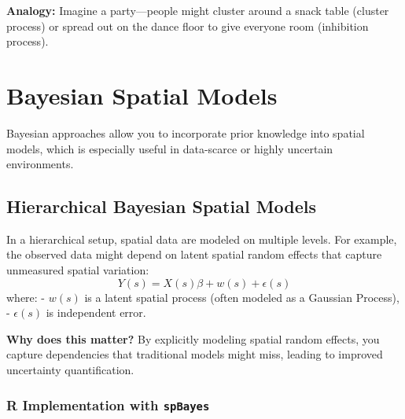 \documentclass[
  11pt,
]{report}
\begin{document}
\textbf{Analogy:} Imagine a party---people might cluster around a snack
table (cluster process) or spread out on the dance floor to give
everyone room (inhibition process).

\section{Bayesian Spatial Models}\label{bayesian-spatial-models}

Bayesian approaches allow you to incorporate prior knowledge into
spatial models, which is especially useful in data-scarce or highly
uncertain environments.

\subsection{Hierarchical Bayesian Spatial
Models}\label{hierarchical-bayesian-spatial-models}

In a hierarchical setup, spatial data are modeled on multiple levels.
For example, the observed data might depend on latent spatial random
effects that capture unmeasured spatial variation: \[
Y(s) = X(s)\beta + w(s) + \epsilon(s)
\] where: - \(w(s)\) is a latent spatial process (often modeled as a
Gaussian Process), - \(\epsilon(s)\) is independent error.

\textbf{Why does this matter?} By explicitly modeling spatial random
effects, you capture dependencies that traditional models might miss,
leading to improved uncertainty quantification.

\subsubsection{\texorpdfstring{R Implementation with
\texttt{spBayes}}{R Implementation with spBayes}}\label{r-implementation-with-spbayes}
\end{document}

